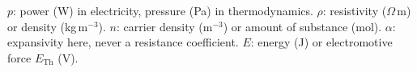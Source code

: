 \documentclass[10pt,a4paper]{article}
\begin{document}
\begin{trapbox}[title={Same letter, different quantity}]
\small
$p$: power (W) in electricity, pressure (Pa) in thermodynamics.\quad
$\rho$: resistivity ($\Omega$\,m) or density (kg\,m$^{-3}$).\quad
$n$: carrier density (m$^{-3}$) or amount of substance (mol).\quad
$\alpha$: expansivity here, never a resistance coefficient.\quad
$E$: energy (J) or electromotive force $E_{\mathrm{Th}}$ (V).
\end{trapbox}
\end{document}
